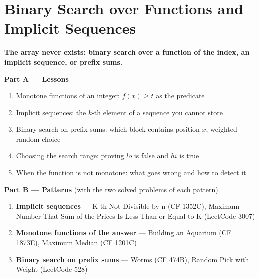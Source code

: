 \chapter{Binary Search over Functions and Implicit Sequences}
\label{ch:predicates}

\begin{tcolorbox}[enhanced, colback=white, colframe=secondaryblue, boxrule=1pt, arc=2mm]
\textbf{\large\textcolor{primaryblue}{The array never exists: binary search over a function of the index, an implicit sequence, or prefix sums.}}
\end{tcolorbox}


\begin{plannedbox}
\textbf{Part A --- Lessons}
\begin{enumerate}[leftmargin=*, label=\textbf{A\arabic*.}, itemsep=1pt]
    \item Monotone functions of an integer: $f(x) \ge t$ as the predicate
    \item Implicit sequences: the $k$-th element of a sequence you cannot store
    \item Binary search on prefix sums: which block contains position $x$, weighted random choice
    \item Choosing the search range: proving $lo$ is false and $hi$ is true
    \item When the function is not monotone: what goes wrong and how to detect it
\end{enumerate}
\textbf{Part B --- Patterns} (with the two solved problems of each pattern)
\begin{enumerate}[leftmargin=*, label=\textbf{P\arabic*.}, itemsep=1pt]
    \item \textbf{Implicit sequences} --- K-th Not Divisible by n {\small\color{darkgray}(CF 1352C)}, Maximum Number That Sum of the Prices Is Less Than or Equal to K {\small\color{darkgray}(LeetCode 3007)}
    \item \textbf{Monotone functions of the answer} --- Building an Aquarium {\small\color{darkgray}(CF 1873E)}, Maximum Median {\small\color{darkgray}(CF 1201C)}
    \item \textbf{Binary search on prefix sums} --- Worms {\small\color{darkgray}(CF 474B)}, Random Pick with Weight {\small\color{darkgray}(LeetCode 528)}
\end{enumerate}
\end{plannedbox}
